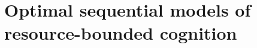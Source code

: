 


\section{Optimal sequential models of resource-bounded cognition}\label{sec:intro-final}



\newcommand{\hl}[2]{%
  {\color{#1!90!black} #2}
}

\newcommand{\specialitem}[2]{%
  \item[%
    {\color{#1} \textbf{#2}}%
  ]
}

